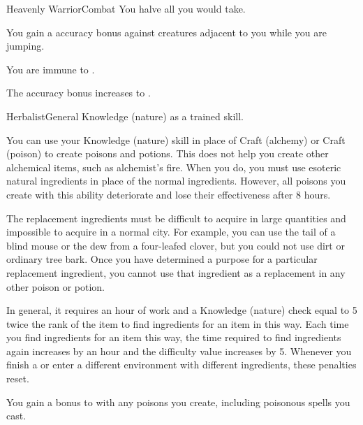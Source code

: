 \begin{feat}{Heavenly Warrior}{Combat}
     You halve all  you would take.

     You gain a  accuracy bonus against  creatures adjacent to you while you are jumping.

     You are immune to .

     The accuracy bonus increases to .
  \end{feat}

  \begin{feat}{Herbalist}{General}
    \featpre Knowledge (nature) as a trained skill.

     You can use your Knowledge (nature) skill in place of Craft (alchemy) or Craft (poison) to create poisons and potions.
    This does not help you create other alchemical items, such as alchemist's fire.
    When you do, you must use esoteric natural ingredients in place of the normal ingredients.
    However, all poisons you create with this ability deteriorate and lose their effectiveness after 8 hours.

    The replacement ingredients must be difficult to acquire in large quantities and impossible to acquire in a normal city.
    For example, you can use the tail of a blind mouse or the dew from a four-leafed clover, but you could not use dirt or ordinary tree bark.
    Once you have determined a purpose for a particular replacement ingredient, you cannot use that ingredient as a replacement in any other poison or potion.

    In general, it requires an hour of work and a Knowledge (nature) check equal to 5 \add twice the rank of the item to find ingredients for an item in this way.
    Each time you find ingredients for an item this way, the time required to find ingredients again increases by an hour and the difficulty value increases by 5.
    Whenever you finish a  or enter a different environment with different ingredients, these penalties reset.

     You gain a  bonus to  with any poisons you create, including poisonous spells you cast.


\end{feat}
